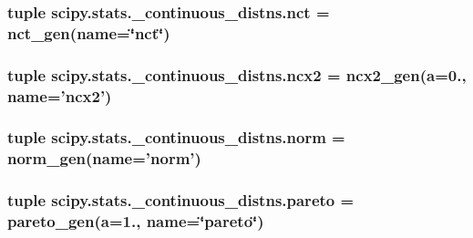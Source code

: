 \subsubsection[{nct}]{\setlength{\rightskip}{0pt plus 5cm}tuple scipy.\+stats.\+\_\+continuous\+\_\+distns.\+nct = {\bf nct\+\_\+gen}(name=\char`\"{}nct\char`\"{})}\label{namespacescipy_1_1stats_1_1__continuous__distns_ad4bd965f05614335ce2cb7533994446d}
\hypertarget{namespacescipy_1_1stats_1_1__continuous__distns_aac72115191c9c44473a87ed108ea4ee9}{}
\subsubsection[{ncx2}]{\setlength{\rightskip}{0pt plus 5cm}tuple scipy.\+stats.\+\_\+continuous\+\_\+distns.\+ncx2 = {\bf ncx2\+\_\+gen}({\bf a}=0., name='ncx2')}\label{namespacescipy_1_1stats_1_1__continuous__distns_aac72115191c9c44473a87ed108ea4ee9}
\hypertarget{namespacescipy_1_1stats_1_1__continuous__distns_a8c50faae73ca641fd8675adf39b1aefd}{}
\subsubsection[{norm}]{\setlength{\rightskip}{0pt plus 5cm}tuple scipy.\+stats.\+\_\+continuous\+\_\+distns.\+norm = {\bf norm\+\_\+gen}(name='norm')}\label{namespacescipy_1_1stats_1_1__continuous__distns_a8c50faae73ca641fd8675adf39b1aefd}
\hypertarget{namespacescipy_1_1stats_1_1__continuous__distns_a6da09f2167f6857fefed25406ece0fdf}{}
\subsubsection[{pareto}]{\setlength{\rightskip}{0pt plus 5cm}tuple scipy.\+stats.\+\_\+continuous\+\_\+distns.\+pareto = {\bf pareto\+\_\+gen}({\bf a}=1., name=\char`\"{}pareto\char`\"{})}\label{namespacescipy_1_1stats_1_1__continuous__distns_a6da09f2167f6857fefed25406ece0fdf}
\hypertarget{namespacescipy_1_1stats_1_1__continuous__distns_afe1d762b0da97a8ac3c6d64e4a2f9c89}{}
